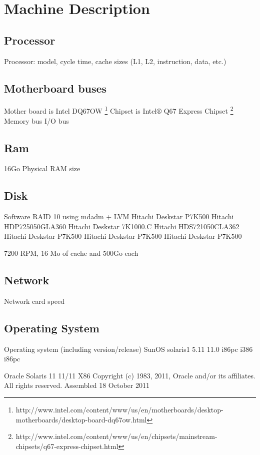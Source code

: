 \section{Machine Description}

\subsection{Processor}

    Processor: model, cycle time, cache sizes (L1, L2, instruction, data, etc.)
\subsection{Motherboard buses}
Mother board is Intel DQ67OW
\footnote{http://www.intel.com/content/www/us/en/motherboards/desktop-motherboards/desktop-board-dq67ow.html}
Chipset is Intel® Q67 Express Chipset \footnote{http://www.intel.com/content/www/us/en/chipsets/mainstream-chipsets/q67-express-chipset.html}
    Memory bus
    I/O bus

\subsection{Ram}
	16Go Physical
    RAM size

\subsection{Disk}
	Software RAID 10 using mdadm + LVM
Hitachi Deskstar P7K500 Hitachi HDP725050GLA360
Hitachi Deskstar 7K1000.C Hitachi HDS721050CLA362
Hitachi Deskstar P7K500
Hitachi Deskstar P7K500
Hitachi Deskstar P7K500

7200 RPM, 16 Mo of cache and 500Go each

\subsection{Network}
    Network card speed

\subsection{Operating System}
    Operating system (including version/release) 
SunOS solaris1 5.11 11.0 i86pc i386 i86pc

                           Oracle Solaris 11 11/11 X86
  Copyright (c) 1983, 2011, Oracle and/or its affiliates.  All rights reserved.
                            Assembled 18 October 2011

